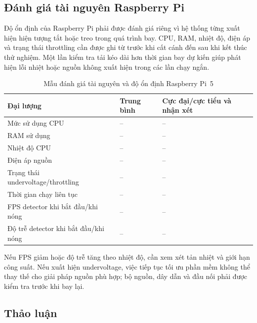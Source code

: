 \subsection{Đánh giá tài nguyên Raspberry Pi}

Độ ổn định của Raspberry Pi phải được đánh giá riêng vì hệ thống từng xuất hiện hiện tượng tắt hoặc treo trong quá trình bay. CPU, RAM, nhiệt độ, điện áp và trạng thái throttling cần được ghi từ trước khi cất cánh đến sau khi kết thúc thử nghiệm. Một lần kiểm tra tải kéo dài hơn thời gian bay dự kiến giúp phát hiện lỗi nhiệt hoặc nguồn không xuất hiện trong các lần chạy ngắn.

\begin{table}[H]
    \centering
    \small
    \caption{Mẫu đánh giá tài nguyên và độ ổn định Raspberry Pi~5}
    \label{tab:raspberry_resources}
    \begin{tabularx}{\textwidth}{>{\raggedright\arraybackslash}p{} >{\raggedright\arraybackslash}p{} X}
        \toprule
        \textbf{Đại lượng} & \textbf{Trung bình} & \textbf{Cực đại/cực tiểu và nhận xét} \\
        \midrule
        Mức sử dụng CPU & -- & -- \\
        RAM sử dụng & -- & -- \\
        Nhiệt độ CPU & -- & -- \\
        Điện áp nguồn & -- & -- \\
        Trạng thái undervoltage/throttling & -- & -- \\
        Thời gian chạy liên tục & -- & -- \\
        FPS detector khi bắt đầu/khi nóng & -- & -- \\
        Độ trễ detector khi bắt đầu/khi nóng & -- & -- \\
        \bottomrule
    \end{tabularx}
\end{table}

Nếu FPS giảm hoặc độ trễ tăng theo nhiệt độ, cần xem xét tản nhiệt và giới hạn công suất. Nếu xuất hiện undervoltage, việc tiếp tục tối ưu phần mềm không thể thay thế cho giải pháp nguồn phù hợp; bộ nguồn, dây dẫn và đầu nối phải được kiểm tra trước khi bay lại.

\subsection{Thảo luận}

